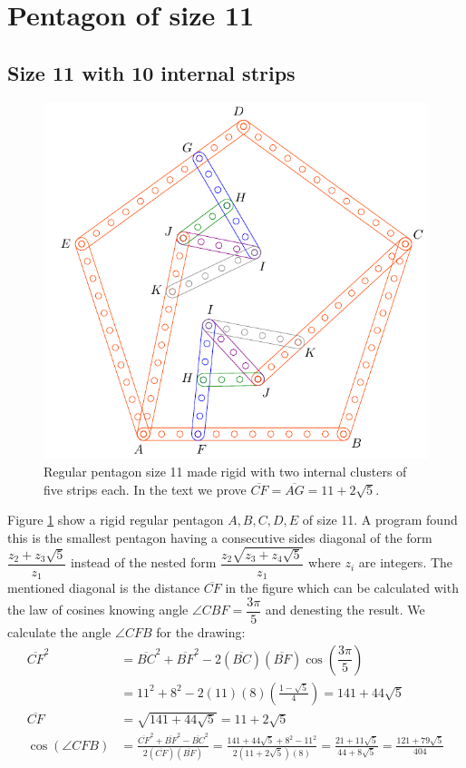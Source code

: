\documentclass[11pt]{article}
\begin{document}
\section{Pentagon of size 11}

\subsection{Size 11 with 10 internal strips}

\begin{figure}[h]
 \centering
 \includegraphics[scale=0.85]{11/penta11a}
 \caption{Regular pentagon size 11 made rigid with two internal clusters of five strips each. In the text we prove $\overline{CF} = \overline{AG} = 11 + 2\sqrt5$.}
 \label{fig:penta11a}
\end{figure}

Figure \ref{fig:penta11a} show a rigid regular pentagon $A,B,C,D,E$ of size 11. A program found this is the smallest pentagon having a consecutive sides diagonal of the form $\dfrac{z_2 + z_3\sqrt5}{z_1}$ instead of the nested form $\dfrac{z_2\sqrt{z_3+z_4\sqrt5}}{z_1}$ where $z_i$ are integers. The mentioned diagonal is the distance $\overline{CF}$ in the figure which can be calculated with the law of cosines knowing angle $\angle{CBF} = \dfrac{3\pi}5$ and denesting the result. We calculate the angle $\angle{CFB}$ for the drawing:
\begin{align}
\overline{CF}^2 &= \overline{BC}^2 + \overline{BF}^2 
 - 2(\overline{BC})(\overline{BF})\cos\left(\dfrac{3\pi}5\right) \nonumber\\
 &= 11^2 + 8^2 - 2(11)(8)\left(\frac{1-\sqrt5}4\right) = 141 + 44\sqrt5 \nonumber\\
\overline{CF} &= \sqrt{141 + 44\sqrt5} = 11 + 2\sqrt5\\
%
\cos(\angle{CFB}) &= \frac{\overline{CF}^2 + \overline{BF}^2 - \overline{BC}^2}
 {2(\overline{CF})(\overline{BF})}%
 = \frac{141+44\sqrt5 + 8^2 - 11^2}{2(11+2\sqrt5)(8)}
  = \frac{21+11\sqrt5}{44+8\sqrt5} = \frac{121+79\sqrt5}{404}
\end{align}
\end{document}
